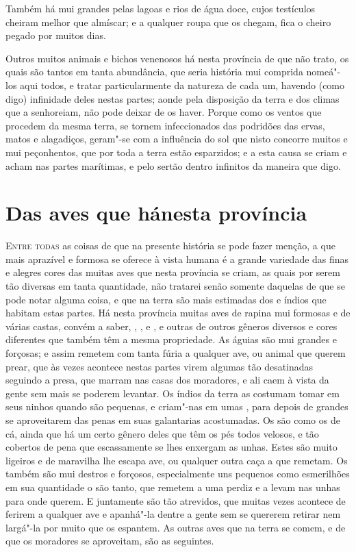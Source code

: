Também há  mui grandes pelas lagoas e rios de água doce, cujos
testículos cheiram melhor que almíscar; e a qualquer roupa que os
chegam, fica o cheiro pegado por muitos dias.

Outros muitos animais e bichos venenosos há nesta província de que não
trato, os quais são tantos em tanta abundância, que seria história mui
comprida nomeá"-los aqui todos, e tratar particularmente da natureza de
cada um, havendo (como digo) infinidade deles nestas partes; aonde pela
disposição da terra e dos climas que a senhoreiam, não pode deixar de os			%
haver. Porque como os ventos que procedem da mesma terra, se tornem
infeccionados das podridões das ervas, matos e alagadiços, geram"-se com
a influência do sol que nisto concorre muitos e mui peçonhentos, que
por toda a terra estão esparzidos; e a esta causa se criam e acham nas
partes marítimas, e pelo sertão dentro infinitos da maneira que digo.


\chapter[Das aves que há nesta província]{Das aves que há\break nesta província}

\noindent\textsc{Entre todas} as coisas de que na presente história se pode fazer menção,
a que mais aprazível e formosa se oferece à vista humana é a grande
variedade das finas e alegres cores das muitas aves que nesta província
se criam, as quais por serem tão diversas em tanta quantidade, não
tratarei senão somente daquelas de que se pode notar alguma coisa, e que
na terra são mais estimadas dos  e índios que habitam estas
partes.
Há nesta província muitas aves de rapina mui formosas e de várias
castas, convém a saber, , , e , e outras de outros
gêneros diversos e cores diferentes que também têm a mesma propriedade.
As águias são mui grandes e forçosas; e assim remetem com tanta fúria a
qualquer ave, ou animal que querem prear, que às vezes acontece nestas
partes virem algumas tão desatinadas seguindo a presa, que marram nas
casas dos moradores, e ali caem à vista da gente sem mais se poderem
levantar. Os índios da terra as costumam tomar em seus ninhos quando			%
são pequenas, e criam"-nas em umas , para depois de grandes se aproveitarem 
das penas em suas galantarias
acostumadas. Os  são como os de cá, ainda que há um certo gênero
deles que têm os pés todos velosos, e tão cobertos de pena que
escassamente se lhes enxergam as unhas. Estes são muito ligeiros e de
maravilha lhe escapa ave, ou qualquer outra caça a que remetam. Os
 também são mui destros e forçosos, especialmente uns pequenos
como esmerilhões em sua quantidade o são tanto, que remetem a uma perdiz
e a levam nas unhas para onde querem. E juntamente são tão atrevidos,
que muitas vezes acontece de ferirem a qualquer ave e apanhá"-la dentre a
gente sem se quererem retirar nem largá"-la por muito que os espantem.
As outras aves que na terra se comem, e de que os moradores se
aproveitam, são as seguintes.

